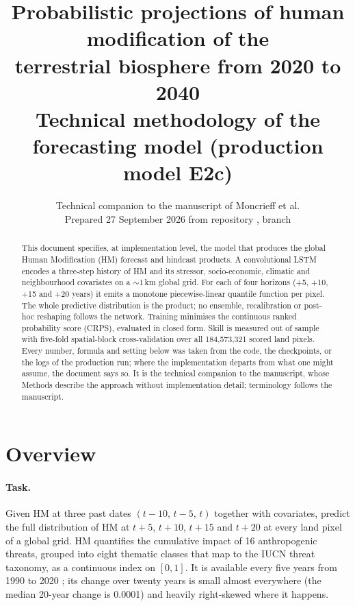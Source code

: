\documentclass[11pt,a4paper]{article}
\title{\textbf{Probabilistic projections of human modification of the\\ terrestrial biosphere from 2020 to 2040}\\[6pt]
\large Technical methodology of the forecasting model (production model E2c)}
\author{}
\date{Technical companion to the manuscript of Moncrieff et al.\\[2pt]
\small Prepared 27 September 2026 from repository \code{spatio-temporal}, branch \code{main}}
\begin{document}
\maketitle
\thispagestyle{empty}

\begin{abstract}
\noindent
This document specifies, at implementation level, the model that produces the global Human
Modification (HM) forecast and hindcast products. A convolutional LSTM encodes a three-step
history of HM and its stressor, socio-economic, climatic and neighbourhood covariates on a
$\sim$1\,km global grid. For each of four horizons (+5, +10, +15 and +20 years) it emits a
monotone piecewise-linear quantile function per pixel. The whole predictive distribution is the
product; no ensemble, recalibration or post-hoc reshaping follows the network. Training
minimises the continuous ranked probability score (CRPS), evaluated in closed form. Skill is
measured out of sample with five-fold spatial-block cross-validation over all
184,573,321 scored land pixels. Every number, formula and setting below was taken from the code,
the checkpoints, or the logs of the production run; where the implementation departs from what
one might assume, the document says so. It is the technical companion to the manuscript, whose
Methods describe the approach without implementation detail; terminology follows the manuscript.
\end{abstract}

\setcounter{tocdepth}{1}
\tableofcontents
\newpage

\section{Overview}

\paragraph{Task.} Given HM at three past dates $(t-10,\,t-5,\,t)$ together with covariates,
predict the full distribution of HM at $t+5$, $t+10$, $t+15$ and $t+20$ at every land pixel of
a global grid. HM quantifies the cumulative impact of 16 anthropogenic threats, grouped into eight thematic
classes that map to the IUCN threat taxonomy, as a continuous index on $[0,1]$. It is available
every five years from 1990 to 2020 \citep{theobald}; its change over twenty years is small almost everywhere (the median 20-year
change is 0.0001) and heavily right-skewed where it happens.
\end{document}
